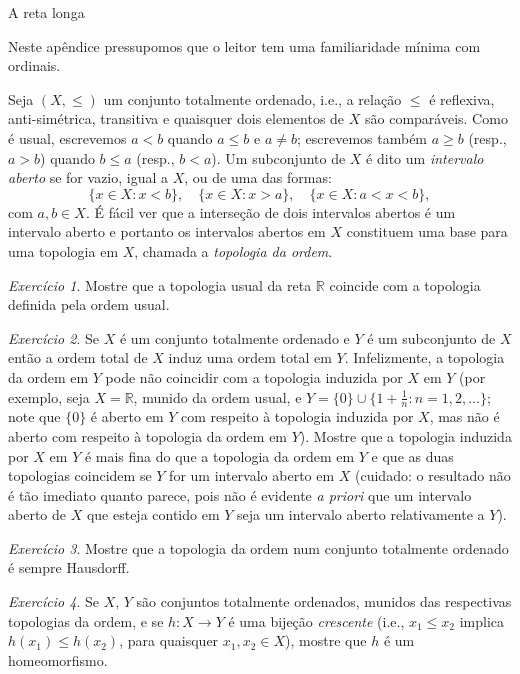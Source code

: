 \documentclass[oneside,11pt]{amsart}
\newcommand{\R}{\mathds R}
\theoremstyle{remark}\newtheorem{exercise}{Exercício}[section]
\theoremstyle{plain}\newtheorem{teo}{Teorema}[section]
\theoremstyle{plain}\newtheorem{lem}[teo]{Lema}
\theoremstyle{plain}\newtheorem{prop}[teo]{Proposição}
\theoremstyle{definition}\newtheorem{defin}[teo]{Definição}
\theoremstyle{remark}\newtheorem{rem}[teo]{Observação}
\theoremstyle{definition}\newtheorem{example}[teo]{Exemplo}
\numberwithin{equation}{section}
\begin{document}
\begin{section}{A reta longa}

Neste apêndice pressupomos que o leitor tem uma familiaridade mínima com ordinais.

Seja $(X,{\le})$ um conjunto totalmente ordenado, i.e., a relação $\le$ é reflexiva, anti-simétrica, transitiva e quaisquer dois elementos de $X$ são comparáveis.
Como é usual, escrevemos $a<b$ quando $a\le b$ e $a\ne b$; escrevemos também $a\ge b$ (resp., $a>b$) quando $b\le a$ (resp., $b<a$).
Um subconjunto de $X$ é dito um {\em intervalo aberto\/} se for vazio, igual a $X$, ou de uma das formas:
\[\big\{x\in X:x<b\big\},\quad\big\{x\in X:x>a\big\},\quad\big\{x\in X:a<x<b\big\},\]
com $a,b\in X$. É fácil ver que a interseção de dois intervalos abertos é um intervalo aberto e portanto os intervalos abertos em $X$ constituem uma base
para uma topologia em $X$, chamada a {\em topologia da ordem}.

\begin{exercise}
Mostre que a topologia usual da reta $\R$ coincide com a topologia definida pela ordem usual.
\end{exercise}

\begin{exercise}\label{exe:subordenado}
Se $X$ é um conjunto totalmente ordenado e $Y$ é um subconjunto de $X$ então a ordem total de $X$ induz uma ordem total em $Y$. Infelizmente,
a topologia da ordem em $Y$ pode não coincidir com a topologia induzida por $X$ em $Y$ (por exemplo, seja $X=\R$, munido da ordem usual, e
$Y=\{0\}\cup\big\{1+\frac1n:n=1,2,\ldots\big\}$; note que $\{0\}$ é aberto em $Y$ com respeito à topologia induzida por $X$, mas não é aberto
com respeito à topologia da ordem em $Y$). Mostre que a topologia induzida por $X$ em $Y$ é mais fina do que a topologia da ordem em $Y$ e que
as duas topologias coincidem se $Y$ for um intervalo aberto em $X$ (cuidado: o resultado não é tão imediato quanto parece, pois não é evidente
{\it a priori\/} que um intervalo aberto de $X$ que esteja contido em $Y$ seja um intervalo aberto relativamente a $Y$).
\end{exercise}

\begin{exercise}
Mostre que a topologia da ordem num conjunto totalmente ordenado é sempre Hausdorff.
\end{exercise}

\begin{exercise}\label{exe:homeocresc}
Se $X$, $Y$ são conjuntos totalmente ordenados, munidos das respectivas topologias da ordem, e se $h:X\to Y$ é uma bijeção {\em crescente\/} (i.e.,
$x_1\le x_2$ implica $h(x_1)\le h(x_2)$, para quaisquer $x_1,x_2\in X$), mostre que $h$ é um homeomorfismo.
\end{exercise}


\end{section}
\end{document}
